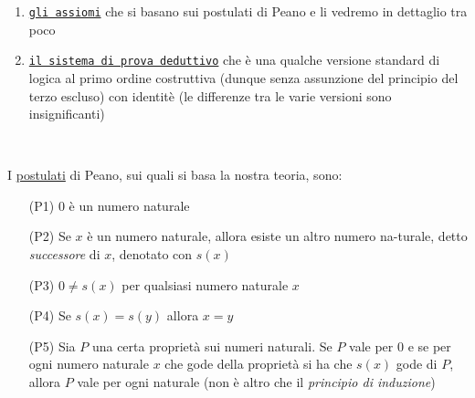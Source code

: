 \begin{enumerate}
\begin{itemize}
\end{itemize}
\vspace{.5cm}
\item \underline{\texttt{gli assiomi}} che si basano sui postulati di Peano e li vedremo in dettaglio tra poco
\vspace{.5cm}
\item \underline{\texttt{il sistema di prova deduttivo}} che \`e una qualche versione standard di logica al primo ordine costruttiva (dunque senza assunzione del principio del terzo escluso) con identit\`e (le differenze tra le varie versioni sono insignificanti)
\end{enumerate}\par\ \par\noindent

I \underline{postulati} di Peano, sui quali si basa la nostra teoria, sono:
\begin{enumerate}
	\item[(P1)] $0$ \`e un numero naturale
	\item[(P2)] Se $x$ \`e un numero naturale, allora esiste un altro numero na-turale, detto \textsl{successore} di $x$, denotato con $s(x)$
	\item[(P3)] $0\neq s(x)$ per qualsiasi numero naturale $x$
	\item[(P4)] Se $s(x)=s(y)$ allora $x=y$
	\item[(P5)] Sia $P$ una certa propriet\`a sui numeri naturali. Se $P$ vale per $0$ e se per ogni numero naturale $x$ che gode della propriet\`a si ha che $s(x)$ gode di $P$, allora $P$ vale per ogni naturale (non \`e altro che il \textsl{principio di induzione})
\end{enumerate}\par\ \par\noindent

